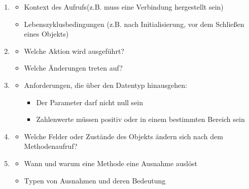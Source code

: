 \begin{infoBox}[title=Wichtige Inhalte von API-Kommentaren:]
    \begin{enumerate}
        \item {}
        \begin{itemize}
            \item Kontext des Aufrufs(z.B. muss eine Verbindung hergestellt sein)
            \item Lebenszyklusbedingungen (z.B. nach Initialisierung, vor dem Schließen eines Objekts)
        \end{itemize}
        \item {}
        \begin{itemize}
            \item Welche Aktion wird ausgeführt?
            \item Welche Änderungen treten auf?
        \end{itemize}
        \item {}
        \begin{itemize}
            \item Anforderungen, die über den Datentyp hinausgehen:
            \begin{itemize}
                \item {} Der Parameter darf nicht null sein
                \item {} Zahlenwerte müssen positiv oder in einem bestimmten Bereich sein
            \end{itemize}
        \end{itemize}
        \item {}
        \begin{itemize}
            \item Welche Felder oder Zustände des Objekts ändern sich nach dem Methodenaufruf?
        \end{itemize}
        \item {}
        \begin{itemize}
            \item Wann und warum eine Methode eine Ausnahme auslöst
            \item Typen von Ausnahmen und deren Bedeutung
        \end{itemize}
    \end{enumerate}
\end{infoBox}
